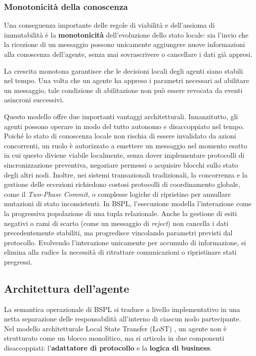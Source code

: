 \subsubsection{Monotonicità della conoscenza}\label{bspl:monotonicita}

Una conseguenza importante delle regole di viabilità e dell'assioma di immutabilità è la 
\textbf{monotonicità} dell'evoluzione dello stato locale: sia l'invio che la ricezione di un messaggio 
possono unicamente aggiungere nuove informazioni alla conoscenza dell'agente, senza mai sovrascrivere o 
cancellare i dati già appresi.

La crescita monotona garantisce che le decisioni locali degli agenti siano stabili nel tempo. 
Una volta che un agente ha appreso i parametri  necessari ad abilitare un messaggio, 
tale condizione di abilitazione non può essere revocata da eventi asincroni successivi.

Questo modello offre due importanti vantaggi architetturali.
Innanzitutto, gli agenti possono operare in modo del tutto autonomo e disaccoppiato nel tempo. 
Poiché lo stato di conoscenza locale non rischia di essere invalidato da azioni 
concorrenti, un ruolo è autorizzato a emettere un messaggio nel momento esatto 
in cui questo diviene viabile localmente, senza dover implementare protocolli 
di sincronizzazione preventiva, negoziare permessi o acquisire blocchi 
sullo stato degli altri nodi. 
Inoltre, nei sistemi transazionali tradizionali, la concorrenza 
e la gestione delle eccezioni richiedono costosi protocolli di coordinamento 
globale, come il \emph{Two-Phase Commit}, o complesse logiche di ripristino per annullare 
mutazioni di stato inconsistenti. In BSPL, l'esecuzione modella l'interazione come la progressiva 
popolazione di una tupla relazionale. Anche la gestione di esiti negativi o rami di 
scarto (come un messaggio di \emph{reject}) non cancella i dati precedentemente 
stabiliti, ma progredisce vincolando parametri previsti dal protocollo. 
Evolvendo l'interazione unicamente per accumulo di informazione, si elimina 
alla radice la necessità di ritrattare comunicazioni o ripristinare stati pregressi.

\subsection{Architettura dell'agente}\label{bspl:architettura_agente}

La semantica operazionale di BSPL si traduce a livello implementativo in una netta separazione 
delle responsabilità all'interno di ciascun nodo partecipante. Nel modello architetturale Local State Transfer
(LoST) \autocite{singh2011lost}, un agente non è strutturato come un blocco monolitico, 
ma si articola in due componenti disaccoppiati: l'\textbf{adattatore di protocollo} e la \textbf{logica di business}.


